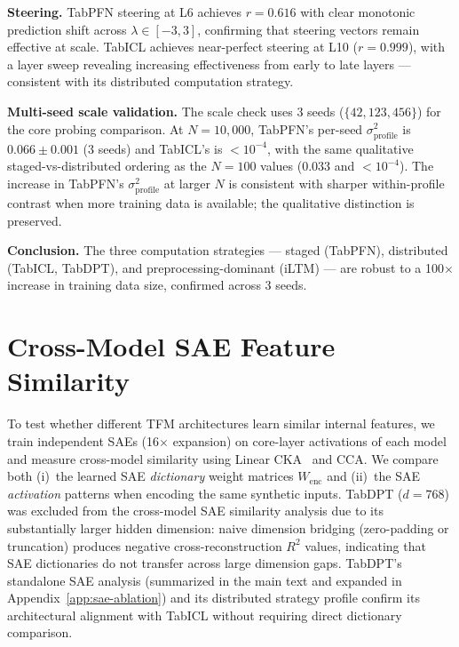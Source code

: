\documentclass{article}
\begin{document}
\textbf{Steering.} TabPFN steering at L6 achieves $r{=}0.616$ with clear monotonic prediction shift across $\lambda \in [-3, 3]$, confirming that steering vectors remain effective at scale. TabICL achieves near-perfect steering at L10 ($r{=}0.999$), with a layer sweep revealing increasing effectiveness from early to late layers --- consistent with its distributed computation strategy.

\textbf{Multi-seed scale validation.} The scale check uses 3 seeds ($\{42, 123, 456\}$) for the core probing comparison. At $N{=}10{,}000$, TabPFN's per-seed $\sigma^2_\text{profile}$ is $0.066 \pm 0.001$ (3 seeds) and TabICL's is $<10^{-4}$, with the same qualitative staged-vs-distributed ordering as the $N{=}100$ values ($0.033$ and $<10^{-4}$). The increase in TabPFN's $\sigma^2_\text{profile}$ at larger $N$ is consistent with sharper within-profile contrast when more training data is available; the qualitative distinction is preserved.

\textbf{Conclusion.} The three computation strategies --- staged (TabPFN), distributed (TabICL, TabDPT), and preprocessing-dominant (iLTM) --- are robust to a 100$\times$ increase in training data size, confirmed across 3 seeds.

\section{Cross-Model SAE Feature Similarity}
\label{app:sae-similarity}

To test whether different TFM architectures learn similar internal features, we train independent SAEs (16$\times$ expansion) on core-layer activations of each model and measure cross-model similarity using Linear CKA~\cite{kornblith2019similarity} and CCA. We compare both (i)~the learned SAE \textit{dictionary} weight matrices $W_{\text{enc}}$ and (ii)~the SAE \textit{activation} patterns when encoding the same synthetic inputs. TabDPT ($d{=}768$) was excluded from the cross-model SAE similarity analysis due to its substantially larger hidden dimension: naive dimension bridging (zero-padding or truncation) produces negative cross-reconstruction $R^2$ values, indicating that SAE dictionaries do not transfer across large dimension gaps. TabDPT's standalone SAE analysis (summarized in the main text and expanded in Appendix~\ref{app:sae-ablation}) and its distributed strategy profile confirm its architectural alignment with TabICL without requiring direct dictionary comparison.
\end{document}
